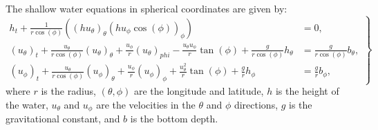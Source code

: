 The shallow water equations in spherical coordinates are given by:
\begin{equation}
    \left.
    \begin{aligned}
        h_t + \frac{1}{r \cos (\phi)} \left( {(h u_\theta)}_{\theta} {(h u_{\phi} \cos(\phi))}_{\phi}  \right) &= 0, \\
        {(u_{\theta})}_t  + \frac{u_\theta}{r \cos (\phi)} {(u_\theta)}_\theta + \frac{u_\phi}{r} {(u_\theta)}_{phi}
        - \frac{u_\theta u_\phi }{r} \tan(\phi) + \frac{g}{r \cos (\phi)} h_\theta &= \frac{g}{r \cos(\phi)} b_\theta, \\
        {(u_{\phi})}_t  + \frac{u_\theta}{r \cos (\phi)} {(u_\phi)}_\theta + \frac{u_\phi}{r} {(u_\phi)}_{\phi}
        + \frac{u_\theta^2}{r} \tan(\phi) + \frac{g}{r} h_\phi &= \frac{g}{r} b_\phi,
    \end{aligned}
    \right\}
\end{equation}
where $r$ is the radius, $(\theta, \phi)$ are the longitude and latitude, $h$ is the height of the water, $u_\theta$ and $u_\phi$ are the velocities in the $\theta$ and $\phi$ directions, $g$ is the gravitational constant, and $b$ is the bottom depth.






